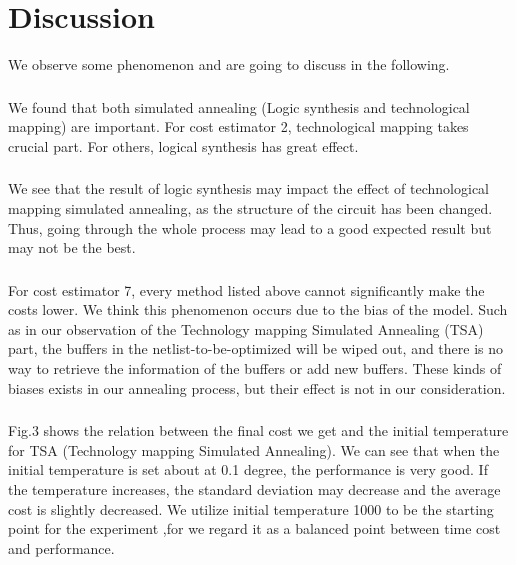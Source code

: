 \documentclass[conference]{IEEEtran}
\begin{document}
\section{Discussion}
We observe some phenomenon and are going to discuss in the following.\\
\subsubsection{}
We found that both simulated annealing (Logic synthesis and technological mapping) are important. For cost estimator 2, technological mapping takes crucial part. For others, logical synthesis has great effect.
\\
\subsubsection{}
We see that the result of logic synthesis may impact the effect of technological mapping simulated annealing, as the structure of the circuit has been changed. Thus, going through the whole process may lead to a good expected result but may not be the best. 
\\
\subsubsection{}
For cost estimator 7, every method listed above cannot significantly make the costs lower. We think this phenomenon occurs due to the bias of the model. Such as in our observation of the Technology mapping Simulated Annealing (TSA) part, the buffers in the netlist-to-be-optimized will be wiped out, and there is no way to retrieve the information of the buffers or add new buffers. These kinds of biases exists in our annealing process, but their effect is not in our consideration.
\\
\subsubsection{}
Fig.3 shows the relation between the final cost we get and the initial temperature for TSA (Technology mapping Simulated Annealing). We can see that when the initial temperature is set about at 0.1 degree, the performance is very good. If the temperature increases, the standard deviation may decrease and the average cost is slightly decreased. We utilize initial temperature 1000 to be the starting point for the experiment ,for we regard it as a balanced point between time cost and performance.
\end{document}
